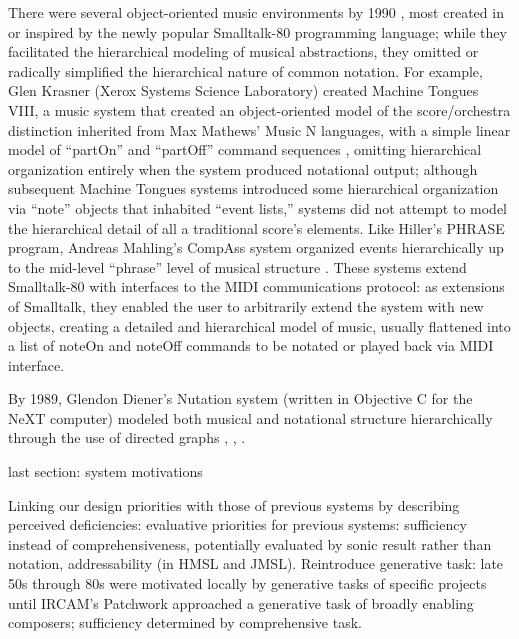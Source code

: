 There were several object-oriented music environments by 1990 \cite[139]{Polansky:1990fk}, most created in or inspired by the newly popular Smalltalk-80 programming language; while they facilitated the hierarchical modeling of musical abstractions, they omitted or radically simplified the hierarchical nature of common notation. For example, Glen Krasner (Xerox Systems Science Laboratory) created Machine Tongues VIII, a music system that created an object-oriented model of the score/orchestra distinction inherited from Max Mathews' Music N languages, with a simple linear model of ``partOn'' and ``partOff'' command sequences \cite{Krasner:1991uq}, omitting hierarchical organization entirely when the system produced notational output; although subsequent Machine Tongues systems introduced some hierarchical organization via ``note'' objects that inhabited ``event lists,'' systems did not attempt to model the hierarchical detail of all a traditional score's elements. Like Hiller's PHRASE program, Andreas Mahling's CompAss system organized events hierarchically up to the mid-level ``phrase'' level of musical structure \cite{Mahling:1991qf}. These systems extend Smalltalk-80 with interfaces to the MIDI communications protocol: as extensions of Smalltalk, they enabled the user to arbitrarily extend the system with new objects, creating a detailed and hierarchical model of music, usually flattened into a list of noteOn and noteOff commands to be notated or played back via MIDI interface. 

By 1989, Glendon Diener's Nutation system (written in Objective C for the NeXT computer) modeled both musical and notational structure hierarchically through the use of directed graphs \cite{Diener:1991zr}, \cite{Diener:1991ly}, \cite{Diener:1989ve}.

last section: system motivations
	

Linking our design priorities with those of previous systems by describing perceived deficiencies: evaluative priorities for previous systems: sufficiency instead of comprehensiveness, potentially evaluated by sonic result rather than notation, addressability (in HMSL and JMSL). Reintroduce generative task: late 50s through 80s were motivated locally by generative tasks of specific projects until IRCAM's Patchwork approached a generative task of broadly enabling composers; sufficiency determined by comprehensive task.